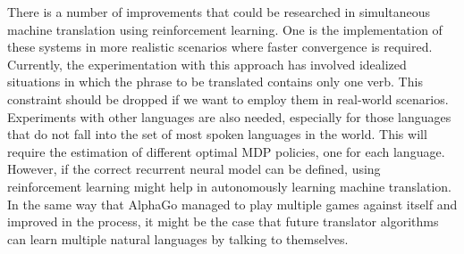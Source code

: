 There is a number of improvements that could be researched in simultaneous machine translation using reinforcement learning. One is the implementation of these systems in more realistic scenarios where faster convergence is required. Currently, the experimentation with this approach has involved idealized situations in which the phrase to be translated contains only one verb. This constraint should be dropped if we want to employ them in real-world scenarios.
Experiments with other languages are also needed, especially for those languages that do not fall into the set of most spoken languages in the world. This will require the estimation of different optimal MDP policies, one for each language. However, if the correct recurrent neural model can be defined, using reinforcement learning might help in autonomously learning machine translation. In the same way that AlphaGo managed to play multiple games against itself and improved in the process, it might be the case that future translator algorithms can learn multiple natural languages by talking to themselves.

